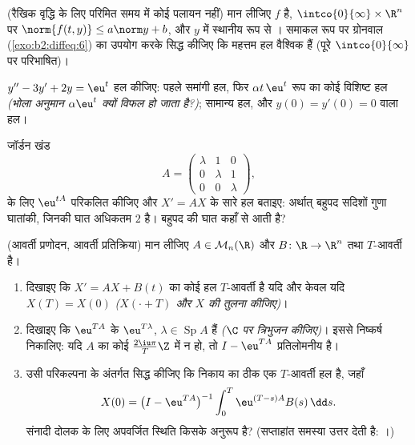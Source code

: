 \begin{exercise}[$\star\star\star$]\label{exo:b2:diffeq:9}
(रैखिक वृद्धि के लिए परिमित समय में कोई पलायन नहीं) मान लीजिए $f$  है,
$\intco{0}{\infty} \times \R^n$ पर $\norm{f(t, y)} \leq a\norm y + b$, और $y$ में स्थानीय रूप से । समाकल रूप पर ग्रोनवाल
(\cref{exo:b2:diffeq:6}) का उपयोग करके सिद्ध कीजिए कि महत्तम हल वैश्विक हैं (पूरे $\intco{0}{\infty}$ पर
परिभाषित)।
\end{exercise}

\begin{exercise}[$\star$]\label{exo:b2:diffeq:10}
$y'' - 3y' + 2y = \eu^{t}$ हल कीजिए: पहले समांगी हल, फिर $\alpha t\,\eu^{t}$ रूप का कोई विशिष्ट हल \emph{(भोला
अनुमान $\alpha\eu^t$ क्यों विफल हो जाता है?)}; सामान्य हल, और $y(0) = y'(0) = 0$ वाला हल।
\end{exercise}

\begin{exercise}[$\star\star$]\label{exo:b2:diffeq:11}
जॉर्डन खंड
\[
A = \begin{pmatrix} \lambda & 1 & 0\\ 0 & \lambda & 1\\
0 & 0 & \lambda\end{pmatrix},
\]
के लिए $\eu^{tA}$ परिकलित कीजिए और $X' = AX$ के सारे हल बताइए: अर्थात् बहुपद सदिशों
गुणा घातांकी, जिनकी घात अधिकतम $2$ है। बहुपद की घात कहाँ से आती है?
\end{exercise}

\begin{exercise}[$\star\star\star$]\label{exo:b2:diffeq:12}
(आवर्ती प्रणोदन, आवर्ती प्रतिक्रिया) मान लीजिए $A \in
\mathcal{M}_n(\R)$ और $B \colon \R \to \R^n$  तथा
$T$-आवर्ती है।
\begin{enumerate}
  \item दिखाइए कि $X' = AX + B(t)$ का कोई हल $T$-आवर्ती है यदि और केवल यदि $X(T) = X(0)$
        \emph{($X(\cdot + T)$ और $X$ की तुलना कीजिए)}।
  \item दिखाइए कि $\eu^{TA}$ के  $\eu^{T\lambda}$, $\lambda \in \operatorname{Sp}A$ हैं \emph{($\C$ पर
        त्रिभुजन कीजिए)}। इससे निष्कर्ष निकालिए: यदि $A$ का कोई
         $\frac{2\iu\pi}{T}\Z$ में न हो, तो $I - \eu^{TA}$ प्रतिलोमनीय है।
  \item उसी परिकल्पना के अंतर्गत सिद्ध कीजिए कि निकाय का ठीक एक
        $T$-आवर्ती हल है, जहाँ
        \[
        X(0) = \bigl(I - \eu^{TA}\bigr)^{-1}
        \int_0^{T}\eu^{(T-s)A}B(s)\,\dd s .
        \]
        संनादी दोलक के लिए अपवर्जित स्थिति किसके अनुरूप है? (सप्ताहांत
        समस्या उत्तर देती है: ।)
\end{enumerate}
\end{exercise}

